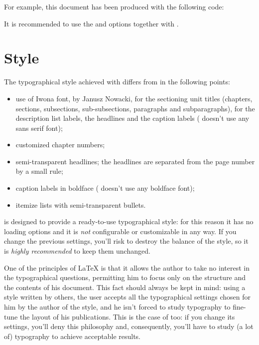 For example, this document has been produced with the following code:

It is recommended to use the  and  options together with \arsclassica.



\section{Style}

The typographical style achieved with \arsclassica{} differs from \classicthesis{} in the following points:
\begin{itemize}
\item use of Iwona font, by Janusz Nowacki, for the sectioning unit titles (chapters, sections, subsections, sub-subsections, paragraphs and subparagraphs), for the description list labels, the headlines and the caption labels (\classicthesis{} doesn't use any sans serif font);
\item customized chapter numbers;
\item semi-transparent headlines; the headlines are separated from the page number by a small rule;
\item caption labels in boldface (\classicthesis{} doesn't use any boldface font);
\item itemize lists with semi-transparent bullets.
\end{itemize}

\arsclassica{} is designed  to provide a ready-to-use typographical style: for this reason it has no loading options and it is \emph{not} configurable or customizable in any way. If you change the previous settings, you'll risk to destroy the balance of the style, so it is \emph{highly recommended} to keep them unchanged.

One of the principles of \LaTeX{} is that it allows the author to take no interest in the typographical questions, permitting him to focus only on the structure and the contents of his document. This fact should always be kept in mind: using a style written by others, the user accepts all the typographical settings chosen for him by the author of the style, and he isn't forced to study typography to fine-tune the layout of his publications. This is the case of \arsclassica{} too: if you change its settings, you'll deny this philosophy and, consequently, you'll have to study (a lot of) typography to achieve acceptable results.

